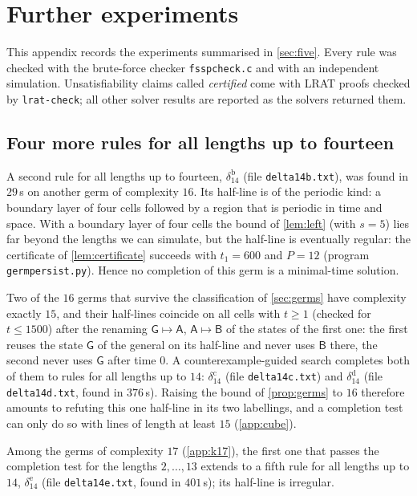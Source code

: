 \section{Further experiments}\label{app:further}

This appendix records the experiments summarised in
\cref{sec:five}. Every rule was checked with the brute-force checker
\texttt{fsspcheck.c} and with an independent simulation. Unsatisfiability
claims called \emph{certified} come with LRAT proofs checked by
\texttt{lrat-check}; all other solver results are reported as the solvers
returned them.

\subsection{Four more rules for all lengths up to fourteen}\label{app:more14}

A second rule for all lengths up to fourteen, $\delta_{14}^{\mathrm b}$
(file \texttt{delta14b.txt}), was found in $29$\,s on another germ of
complexity $16$. Its half-line is of the periodic kind: a boundary layer
of four cells followed by a region that is periodic in time and space. With
a boundary layer of four cells the bound of \cref{lem:left} (with $s=5$)
lies far beyond the lengths we can simulate, but the half-line is
eventually regular: the certificate of \cref{lem:certificate} succeeds
with $t_1=600$ and $P=12$ (program \texttt{germpersist.py}). Hence no
completion of this germ is a minimal-time solution.

Two of the $16$ germs that survive the classification of \cref{sec:germs}
have complexity exactly $15$, and their half-lines coincide on all cells
with $t\ge1$ (checked for $t\le1500$) after the renaming
$\mathsf G\mapsto\mathsf A$, $\mathsf A\mapsto\mathsf B$ of the states of
the first one: the first reuses the state $\mathsf G$ of the general on
its half-line and never uses $\mathsf B$ there, the second never uses
$\mathsf G$ after time $0$. A counterexample-guided search completes both
of them to rules for all lengths up to $14$: $\delta_{14}^{\mathrm c}$ (file
\texttt{delta14c.txt}) and $\delta_{14}^{\mathrm d}$ (file
\texttt{delta14d.txt}, found in $376$\,s). Raising the bound of
\cref{prop:germs} to $16$ therefore amounts to refuting this one half-line
in its two labellings, and a completion test can only do so with lines of
length at least $15$ (\cref{app:cube}).

Among the germs of complexity $17$ (\cref{app:k17}), the first one that
passes the completion test for the lengths $2,\dots,13$ extends to a fifth
rule for all lengths up to $14$, $\delta_{14}^{\mathrm e}$ (file
\texttt{delta14e.txt}, found in $401$\,s); its half-line is irregular.


